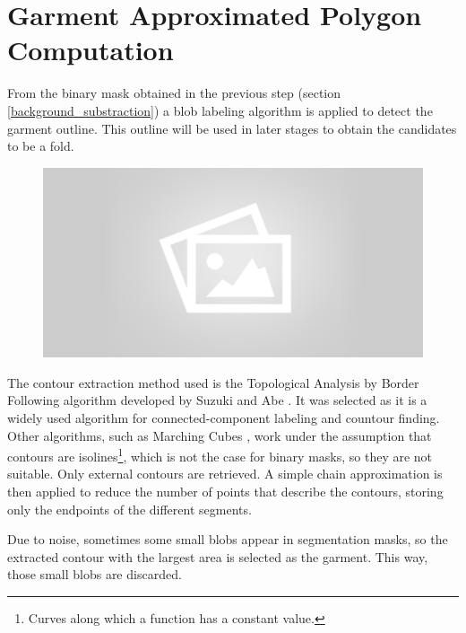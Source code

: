 \section{Garment Approximated Polygon Computation}
From the binary mask obtained in the previous step (section \ref{background_substraction}) a blob labeling algorithm is applied to detect the garment outline. This outline will be used in later stages to obtain the candidates to be a fold.

\begin{figure}[thpb]
    \centering
    \includegraphics[width=0.9
    \textwidth]{figures/placeholder2.png}
    \caption{}
    \label{fig:garment_polygon_processes}
\end{figure}

The contour extraction method used is the Topological Analysis by Border Following algorithm developed by Suzuki and Abe  {}. It was selected as it is a widely used algorithm for connected-component labeling and countour finding. Other algorithms, such as Marching Cubes , work under the assumption that contours are isolines\footnote{Curves along which a  function has a constant value.}, which is not the case for binary masks, so they are not suitable. Only external contours are retrieved. A simple chain approximation is then applied to reduce the number of points that describe the contours, storing only the endpoints of the different segments.

Due to noise, sometimes some small blobs appear in segmentation masks, so the extracted contour with the largest area is selected as the garment. This way, those small blobs are discarded.

